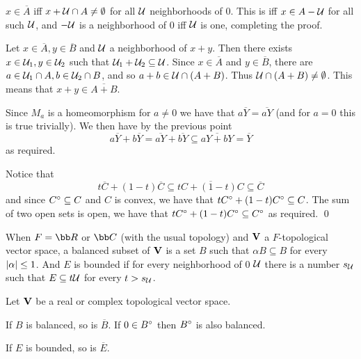 \eprop

\bproof

    \benum
        \item $x\in\overline A$ iff $x+{\cal U}\cap A\neq\emptyset$ for all ${\cal U}$ neighborhoods of $0$.
        This is iff $x\in A-{\cal U}$ for all such ${\cal U}$, and $-{\cal U}$ is a neighborhood of $0$ iff ${\cal U}$ is one, completing the proof.
        \item Let $x\in\overline A,y\in\overline B$ and ${\cal U}$ a neighborhood of $x+y$.
        Then there exists $x\in{\cal U}_1,y\in{\cal U}_2$ such that ${\cal U}_1+{\cal U}_2\subseteq{\cal U}$.
        Since $x\in\overline A$ and $y\in\overline B$, there are $a\in{\cal U}_1\cap A,b\in{\cal U}_2\cap B$, and so $a+b\in{\cal U}\cap(A+B)$.
        Thus ${\cal U}\cap(A+B)\neq\emptyset$.
        This means that $x+y\in\overline{A+B}$.
        \item Since $M_a$ is a homeomorphism for $a\neq0$ we have that $a\overline Y=\overline{aY}$ (and for $a=0$ this is true trivially).
        We then have by the previous point
        $$ a\overline Y + b\overline Y = \overline{aY} + \overline{bY} \subseteq \overline{aY+bY} = \overline Y $$
        as required.
        \item Notice that
        $$ t\overline C + (1-t)\overline C \subseteq \overline{tC + (1-t)C} \subseteq \overline C $$
        and since $C^{\circ}\subseteq C$ and $C$ is convex, we have that $tC^{\circ}+(1-t)C^{\circ}\subseteq C$.
        The sum of two open sets is open, we have that $tC^{\circ}+(1-t)C^{\circ}\subseteq C^{\circ}$ as required.
        \qed
    \eenum

\eproof

\bdefn

    When $F=\bb R$ or $\bb C$ (with the usual topology) and ${\bf V}$ a $F$-topological vector space, a {\emphcolor balanced subset} of ${\bf V}$ is a set $B$ such that $\alpha B\subseteq B$ for every $\mathopen{}\mathclose{\left|\alpha\right|}\leq1$.
    And $E$ is {\emphcolor bounded} if for every neighborhood of $0$ ${\cal U}$ there is a number $s_{{\cal U}}$ such that $E\subseteq t{\cal U}$ for every $t>s_{{\cal U}}$.

\edefn

\bprop

    Let ${\bf V}$ be a real or complex topological vector space.
    \benum
        \item If $B$ is balanced, so is $\overline B$.
        If $0\in B^{\circ}$ then $B^{\circ}$ is also balanced.
        \item If $E$ is bounded, so is $\overline E$.
    \eenum

\eprop

